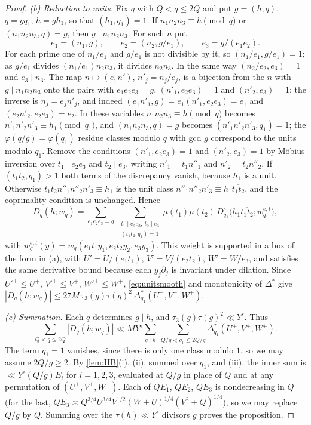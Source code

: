 \documentclass[11pt,colorlinks]{charlie}
\begin{document}
\begin{proof}
\emph{(b) Reduction to units.} Fix $q$ with $Q<q\le2Q$ and put $g=(h,q)$, $q=gq_1$, $h=gh_1$, so that $(h_1,q_1)=1$. If $n_1n_2n_3\equiv h\pmod q$ or $(n_1n_2n_3,q)=g$, then $g\mid n_1n_2n_3$. For such $n$ put
\[
 e_1=(n_1,g),\qquad e_2=(n_2,g/e_1),\qquad e_3=g/(e_1e_2).
\]
For each prime one of $n_1/e_1$ and $g/e_1$ is not divisible by it, so $(n_1/e_1,g/e_1)=1$; as $g/e_1$ divides $(n_1/e_1)n_2n_3$, it divides $n_2n_3$. In the same way $(n_2/e_2,e_3)=1$ and $e_3\mid n_3$. The map $n\mapsto(e,n')$, $n'_j=n_j/e_j$, is a bijection from the $n$ with $g\mid n_1n_2n_3$ onto the pairs with $e_1e_2e_3=g$, $(n'_1,e_2e_3)=1$ and $(n'_2,e_3)=1$; the inverse is $n_j=e_jn'_j$, and indeed $(e_1n'_1,g)=e_1(n'_1,e_2e_3)=e_1$ and $(e_2n'_2,e_2e_3)=e_2$. In these variables $n_1n_2n_3\equiv h\pmod q$ becomes $n'_1n'_2n'_3\equiv h_1\pmod{q_1}$, and $(n_1n_2n_3,q)=g$ becomes $(n'_1n'_2n'_3,q_1)=1$; the $\varphi(q/g)=\varphi(q_1)$ residue classes modulo $q$ with gcd $g$ correspond to the units modulo $q_1$. Remove the conditions $(n'_1,e_2e_3)=1$ and $(n'_2,e_3)=1$ by M\"obius inversion over $t_1\mid e_2e_3$ and $t_2\mid e_3$, writing $n'_1=t_1n''_1$ and $n'_2=t_2n''_2$. If $(t_1t_2,q_1)>1$ both terms of the discrepancy vanish, because $h_1$ is a unit. Otherwise $t_1t_2n''_1n''_2n'_3\equiv h_1$ is the unit class $n''_1n''_2n'_3\equiv h_1\overline{t_1t_2}$, and the coprimality condition is unchanged. Hence
\[
 D_q(h;w_q)=\sum_{e_1e_2e_3=g}\ \sum_{\substack{t_1\mid e_2e_3,\ t_2\mid e_3\\(t_1t_2,q_1)=1}}\mu(t_1)\mu(t_2)\,D^\circ_{q_1}\big(h_1\overline{t_1t_2};w_q^{e,t}\big),
\]
with $w_q^{e,t}(y)=w_q(e_1t_1y_1,e_2t_2y_2,e_3y_3)$. This weight is supported in a box of the form in (a), with $U'=U/(e_1t_1)$, $V'=V/(e_2t_2)$, $W'=W/e_3$, and satisfies the same derivative bound because each $y_j\partial_j$ is invariant under dilation. Since $U'^+\le U^+$, $V'^+\le V^+$, $W'^+\le W^+$, \eqref{eq:unitsmooth} and monotonicity of $\Delta^*$ give $|D_q(h;w_q)|\le27M\,\tau_3(g)\tau(g)^2\,\Delta^*_{q_1}(U^+,V^+,W^+)$.

\emph{(c) Summation.} Each $q$ determines $g\mid h$, and $\tau_3(g)\tau(g)^2\ll Y^\epsilon$. Thus
\[
 \sum_{Q<q\le2Q}|D_q(h;w_q)|\ll MY^\epsilon\sum_{g\mid h}\ \sum_{Q/g<q_1\le2Q/g}\Delta^*_{q_1}(U^+,V^+,W^+).
\]
The term $q_1=1$ vanishes, since there is only one class modulo $1$, so we may assume $2Q/g\ge2$. By \cref{lem:HB}(i), (ii), summed over $q_1$, and (iii), the inner sum is $\ll Y^\epsilon(Q/g)E_i$ for $i=1,2,3$, evaluated at $Q/g$ in place of $Q$ and at any permutation of $(U^+,V^+,W^+)$. Each of $QE_1$, $QE_2$, $QE_3$ is nondecreasing in $Q$ (for the last, $QE_3\asymp Q^{3/4}U^{3/4}V^{1/2}(W+U)^{1/4}(V^2+Q)^{1/4}$), so we may replace $Q/g$ by $Q$. Summing over the $\tau(h)\ll Y^\epsilon$ divisors $g$ proves the proposition.
\end{proof}
\end{document}
